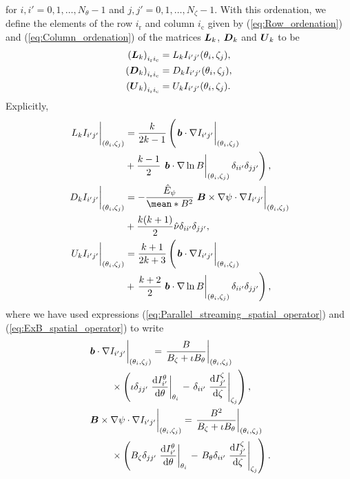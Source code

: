 for $i,i'=0,1,\ldots,N_\theta-1$ and  $j,j'=0,1,\ldots,N_\zeta-1$. With this ordenation, we define the elements of the row $i_{\text{r}}$ and column $i_{\text{c}}$ given by (\ref{eq:Row_ordenation}) and (\ref{eq:Column_ordenation}) of the matrices $\vb*{L}_k$, $\vb*{D}_k$ and $\vb*{U}_k$ to be 
%
\begin{align}
	\left(\vb*{L}_k\right)_{i_{\text{r}} i_{\text{c}}}
	& =
	{L_k I_{i'j'}}{(\theta_i,\zeta_j)},
	\\
	\left(\vb*{D}_k\right)_{i_{\text{r}} i_{\text{c}}}
	& =
	{D_k I_{i'j'}}{(\theta_i,\zeta_j)},
	\\
	\left(\vb*{U}_k\right)_{i_{\text{r}} i_{\text{c}}}
	& =
	{U_k I_{i'j'}}{(\theta_i,\zeta_j)}.
\end{align}
Explicitly,
\begin{align}
	\eval{L_k I_{i'j'}}_{(\theta_i,\zeta_j)}
	& =
	\frac{k}{2k-1} 
	\left(
	\eval{\vb*{b} \cdot \nabla I_{i'j'}}_{(\theta_i,\zeta_j)}
	 \nonumber
	 \right.
	 \\
	 &
	 +
	\frac{k-1}{2}
	\left.
	\eval{\vb*{b}\cdot\nabla \ln B}_{(\theta_i,\zeta_j)}	
	\delta_{ii'}\delta_{jj'}
	\right)
    ,
	\\
	\eval{D_k I_{i'j'}}_{(\theta_i,\zeta_j)}
	& =
	-\frac{\hat{E}_\psi}{\mean*{B^2}}
	\eval{\vb*{B}\times \nabla\psi  \cdot \nabla 
	I_{i'j'}}_{(\theta_i,\zeta_j)}
	\nonumber \\
	& +  
	\frac{k(k+1)}{2}
	\hat{\nu}\delta_{ii'}\delta_{jj'}
	,
	\\
	\eval{U_k I_{i'j'}}_{(\theta_i,\zeta_j)}
	& = 
	\frac{k+1}{2k+3} 
	\left(
	\eval{\vb*{b} \cdot \nabla  I_{i'j'}}_{(\theta_i,\zeta_j) } 
	\right. \nonumber
	\\
	& +
	\left.
	\frac{k+2}{2}
	\eval{\vb*{b}\cdot\nabla \ln B}_{(\theta_i,\zeta_j)}	
	\delta_{ii'}\delta_{jj'}
	\right)
	,
\end{align}
where we have used expressions (\ref{eq:Parallel_streaming_spatial_operator}) and (\ref{eq:ExB_spatial_operator}) to write
%
\begin{align}
    & \eval{\vb*{b} \cdot \nabla  I_{i'j'}}_{(\theta_i,\zeta_j) }
	=
	\eval{\frac{B}{B_\zeta + \iota B_\theta}}_{(\theta_i,\zeta_j)}
	\nonumber\\
	& \qquad \times
	\left(
	\iota 
	\delta_{jj'}
	\eval{\dv{I_{i'}^{\theta}}{\theta}}_{\theta_i}
	\right.
	 -
	\left.
	\delta_{ii'}
	\eval{\dv{I_{j'}^{\zeta}}{\zeta}}_{\zeta_j}
	\right),
	\\
	& \eval{\vb*{B}\times \nabla\psi  \cdot \nabla 
	I_{i'j'}}_{(\theta_i,\zeta_j)}
    =
    \eval{\frac{B^2}{B_\zeta + \iota B_\theta}}_{(\theta_i,\zeta_j)}
    \nonumber \\ 
    &
    \qquad
    \times\left(
    B_\zeta 
    \delta_{jj'}
    \eval{\dv{I_{i'}^{\theta}}{\theta}}_{\theta_i}
    \right. 
    -
    \left.
    B_\theta 
    \delta_{ii'}
    \eval{\dv{I_{j'}^{\zeta}}{\zeta}}_{\zeta_j}
    \right).
\end{align}
